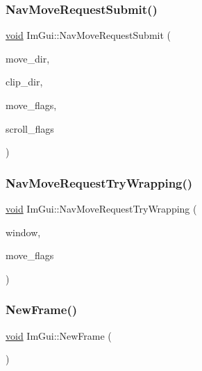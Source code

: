 \subsubsection{\texorpdfstring{Nav\+Move\+Request\+Submit()}{NavMoveRequestSubmit()}}
{\footnotesize\ttfamily \hyperlink{imgui__impl__opengl3__loader_8h_ac668e7cffd9e2e9cfee428b9b2f34fa7}{void} Im\+Gui\+::\+Nav\+Move\+Request\+Submit (\begin{DoxyParamCaption}\item[{Im\+Gui\+Dir}]{move\+\_\+dir,  }\item[{Im\+Gui\+Dir}]{clip\+\_\+dir,  }\item[{\hyperlink{imgui__internal_8h_aff7a453b89555bb074f2fe46a159ac25}{Im\+Gui\+Nav\+Move\+Flags}}]{move\+\_\+flags,  }\item[{\hyperlink{imgui__internal_8h_a3c23ec9366e4bede0fedb065a79dcbc1}{Im\+Gui\+Scroll\+Flags}}]{scroll\+\_\+flags }\end{DoxyParamCaption})}

\mbox{\label{namespaceImGui_a95a9a1a5411cccb918fc29a0b0d3f953}} 
\subsubsection{\texorpdfstring{Nav\+Move\+Request\+Try\+Wrapping()}{NavMoveRequestTryWrapping()}}
{\footnotesize\ttfamily \hyperlink{imgui__impl__opengl3__loader_8h_ac668e7cffd9e2e9cfee428b9b2f34fa7}{void} Im\+Gui\+::\+Nav\+Move\+Request\+Try\+Wrapping (\begin{DoxyParamCaption}\item[{\hyperlink{structImGuiWindow}{Im\+Gui\+Window} $\ast$}]{window,  }\item[{\hyperlink{imgui__internal_8h_aff7a453b89555bb074f2fe46a159ac25}{Im\+Gui\+Nav\+Move\+Flags}}]{move\+\_\+flags }\end{DoxyParamCaption})}

\mbox{\label{namespaceImGui_ab3f1fc018f903b7ad79fd10663375774}} 
\subsubsection{\texorpdfstring{New\+Frame()}{NewFrame()}}
{\footnotesize\ttfamily \hyperlink{imgui__impl__opengl3__loader_8h_ac668e7cffd9e2e9cfee428b9b2f34fa7}{void} Im\+Gui\+::\+New\+Frame (\begin{DoxyParamCaption}{ }\end{DoxyParamCaption})}


